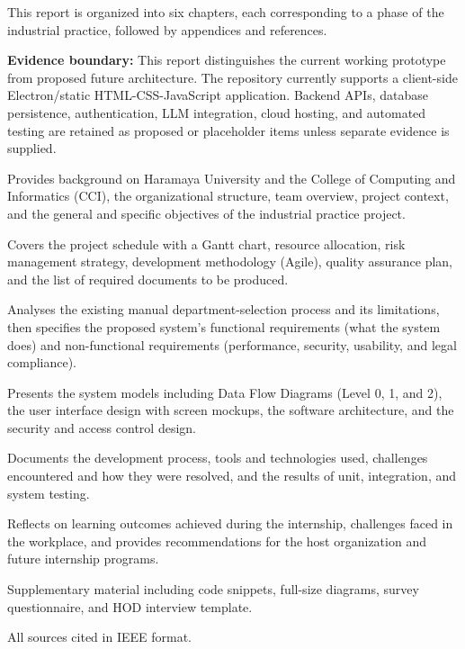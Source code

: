 \documentclass[12pt, a4paper]{article}
\begin{document}
This report is organized into six chapters, each corresponding to a phase of the industrial practice, followed by appendices and references.

\textbf{Evidence boundary:} This report distinguishes the current working prototype from proposed future architecture. The repository currently supports a client-side Electron/static HTML-CSS-JavaScript application. Backend APIs, database persistence, authentication, LLM integration, cloud hosting, and automated testing are retained as proposed or placeholder items unless separate evidence is supplied.

\begin{description}[leftmargin=2.5cm, style=nextline, itemsep=6pt]
\item[\textbf{Chapter 1 --- Introduction}]
    Provides background on Haramaya University and the College of Computing and Informatics (CCI), the organizational structure, team overview, project context, and the general and specific objectives of the industrial practice project.

\item[\textbf{Chapter 2 --- Software Development Plan}]
    Covers the project schedule with a Gantt chart, resource allocation, risk management strategy, development methodology (Agile), quality assurance plan, and the list of required documents to be produced.

\item[\textbf{Chapter 3 --- System Requirements}]
    Analyses the existing manual department-selection process and its limitations, then specifies the proposed system's functional requirements (what the system does) and non-functional requirements (performance, security, usability, and legal compliance).

\item[\textbf{Chapter 4 --- System Analysis \& Design}]
    Presents the system models including Data Flow Diagrams (Level 0, 1, and 2), the user interface design with screen mockups, the software architecture, and the security and access control design.

\item[\textbf{Chapter 5 --- Implementation}]
    Documents the development process, tools and technologies used, challenges encountered and how they were resolved, and the results of unit, integration, and system testing.

\item[\textbf{Chapter 6 --- Internship Reflection \& Conclusion}]
    Reflects on learning outcomes achieved during the internship, challenges faced in the workplace, and provides recommendations for the host organization and future internship programs.

\item[\textbf{Appendices}]
    Supplementary material including code snippets, full-size diagrams, survey questionnaire, and HOD interview template.

\item[\textbf{References}]
    All sources cited in IEEE format.
\end{description}
\end{document}
